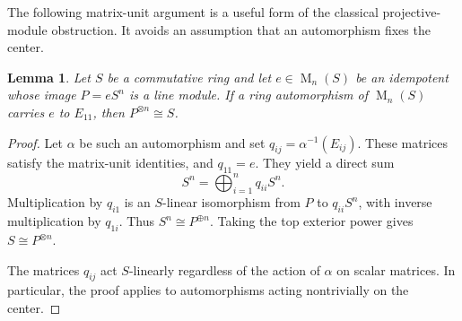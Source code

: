 \documentclass[11pt]{article}
\newtheorem{lemma}[theorem]{Lemma}
\theoremstyle{remark}
\DeclareMathOperator{\Mat}{M}
\begin{document}
The following matrix-unit argument is a useful form of the classical projective-module obstruction. It avoids an assumption that an automorphism fixes the center.

\begin{lemma}\label{lem:automorphism}
Let $S$ be a commutative ring and let $e\in\Mat_n(S)$ be an idempotent whose image $P=eS^n$ is a line module. If a ring automorphism of $\Mat_n(S)$ carries $e$ to $E_{11}$, then $P^{\otimes n}\cong S$.
\end{lemma}
\begin{proof}
Let $\alpha$ be such an automorphism and set $q_{ij}=\alpha^{-1}(E_{ij})$. These matrices satisfy the matrix-unit identities, and $q_{11}=e$. They yield a direct sum
\[
 S^n=\bigoplus_{i=1}^n q_{ii}S^n.
\]
Multiplication by $q_{i1}$ is an $S$-linear isomorphism from $P$ to $q_{ii}S^n$, with inverse multiplication by $q_{1i}$. Thus $S^n\cong P^{\oplus n}$. Taking the top exterior power gives $S\cong P^{\otimes n}$.

The matrices $q_{ij}$ act $S$-linearly regardless of the action of $\alpha$ on scalar matrices. In particular, the proof applies to automorphisms acting nontrivially on the center.
\end{proof}
\end{document}
